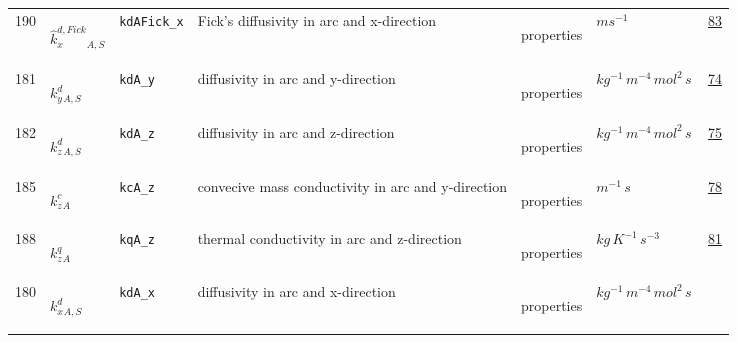 \begin{longtable}{|p{1cm}|p{2.5cm}|p{4.5cm}|p{8cm}|p{3.0cm}|p{3cm}|p{1cm}|}
                 \\
            190
             & \hypertarget{"v:190"}{ $ {{\hat{k}^{d,Fick}_x}}{_{A, S}} $}
             & \verb|kdAFick_x|
             & Fick's diffusivity in arc and x-direction
             & \begin{lay}properties \end{lay}
             & $ m s^{-1} \, $
             &                 \hyperlink{"e:83"}{ 83 }
                 \\
            181
             & \hypertarget{"v:181"}{ $ {{k^d_y}}{_{A, S}} $}
             & \verb|kdA_y|
             & diffusivity in arc and y-direction
             & \begin{lay}properties \end{lay}
             & $ kg^{-1} \,m^{-4} \,mol^{2} \,s \, $
             &                 \hyperlink{"e:74"}{ 74 }
                 \\
            182
             & \hypertarget{"v:182"}{ $ {{k^d_z}}{_{A, S}} $}
             & \verb|kdA_z|
             & diffusivity in arc and z-direction
             & \begin{lay}properties \end{lay}
             & $ kg^{-1} \,m^{-4} \,mol^{2} \,s \, $
             &                 \hyperlink{"e:75"}{ 75 }
                 \\
            185
             & \hypertarget{"v:185"}{ $ {{k^c_z}}{_{A}} $}
             & \verb|kcA_z|
             & convecive mass conductivity in arc and y-direction
             & \begin{lay}properties \end{lay}
             & $ m^{-1} \,s \, $
             &                 \hyperlink{"e:78"}{ 78 }
                 \\
            188
             & \hypertarget{"v:188"}{ $ {{k^q_z}}{_{A}} $}
             & \verb|kqA_z|
             & thermal conductivity in arc and z-direction
             & \begin{lay}properties \end{lay}
             & $ kg \,K^{-1} \,s^{-3} \, $
             &                 \hyperlink{"e:81"}{ 81 }
                 \\
            180
             & \hypertarget{"v:180"}{ $ {{k^d_x}}{_{A, S}} $}
             & \verb|kdA_x|
             & diffusivity in arc and x-direction
             & \begin{lay}properties \end{lay}
             & $ kg^{-1} \,m^{-4} \,mol^{2} \,s \, $

\end{longtable}
